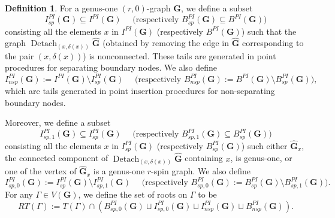\documentclass[11pt]{amsart}
\theoremstyle{definition}
\newtheorem{dfn}[dummy]{Definition}
\theoremstyle{remark}
\newcommand{\<}{\left<}
\renewcommand{\>}{\right>}
\numberwithin{equation}{section}
\begin{document}
\begin{dfn}
For a genus-one $(r,0)$-graph $\mathbf{G}$, we define a subset
$$I^{PI}_{sp}(\mathbf{G})\subseteq I^{PI}(\mathbf{G}) \quad\text{  (respectively } B^{PI}_{sp}(\mathbf{G})\subseteq B^{PI}(\mathbf{G})\text{)}$$ consisting all the elements $x$ in $I^{PI}(\mathbf{G})$ (respectively $B^{PI}(\mathbf{G})$) such that the graph $\operatorname{Detach}_{(x,\delta(x))}\hat{\mathbf{G}}$ (obtained by removing the edge in $\hat{\mathbf{G}}$ corresponding to the pair $(x,\delta(x))$) %
is nonconnected. These %
tails are generated in point procedures for separating boundary nodes. 
We also define 
$$I^{PI}_{nsp}(\mathbf{G}):=I^{PI}(\mathbf{G})\setminus I^{PI}_{sp}(\mathbf{G}) \quad \text{  (respectively } B^{PI}_{nsp}(\mathbf{G}):=B^{PI}(\mathbf{G})\setminus B^{PI}_{sp}(\mathbf{G})\text{)},$$
which are tails generated in point insertion procedures for non-separating boundary nodes.

Moreover, we define a subset
$$I^{PI}_{sp,1}(\mathbf{G})\subseteq I^{PI}_{sp}(\mathbf{G}) \quad\text{  (respectively } B^{PI}_{sp,1}(\mathbf{G})\subseteq B^{PI}_{sp}(\mathbf{G})\text{)}$$ consisting all the elements $x$ in $I^{PI}_{sp}(\mathbf{G})$ (respectively $B^{PI}_{sp}(\mathbf{G})$) such either $\hat{\mathbf{G}}_{x}$, the connected component of $\operatorname{Detach}_{(x,\delta(x))}\hat{\mathbf{G}}$ containing $x$, is genus-one, or one of  the vertex of $\hat{\mathbf{G}}_{x}$ is a genus-one $r$-spin graph. We also %
define
$$I^{PI}_{sp,0}(\mathbf{G}):=I^{PI}_{sp}(\mathbf{G})\setminus I^{PI}_{sp,1}(\mathbf{G}) \quad \text{  (respectively } B^{PI}_{sp,0}(\mathbf{G}):=B^{PI}_{sp}(\mathbf{G})\setminus B^{PI}_{sp,1}(\mathbf{G})\text{)}.$$
For %
any $\Gamma\in V(\bm{G})$, we define the set of roots on $\Gamma$ to be
\begin{equation}\label{eq root for vertices of PI graph}
RT(\Gamma):=T(\Gamma)\cap(B^{PI}_{sp,0}(\mathbf{G})\sqcup I^{PI}_{sp,0}(\mathbf{G})\sqcup I^{PI}_{nsp}(\mathbf{G})\sqcup B^{PI}_{nsp}(\mathbf{G})).
\end{equation}
\end{dfn}
\end{document}
